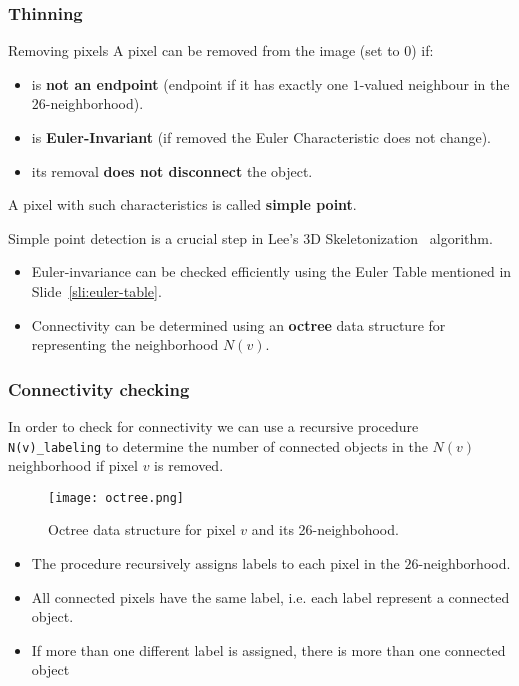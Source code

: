 \begin{frame}
  \frametitle{Thinning}
  \begin{block}{Removing pixels}
    A pixel can be removed from the image (set to 0) if:
    \begin{itemize}
      \item is \textbf{not an endpoint} (endpoint if it has exactly one $1$-valued neighbour in the $26$-neighborhood).
      \item is \textbf{Euler-Invariant} (if removed the Euler Characteristic does not change).
      \item its removal \textbf{does not disconnect} the object.
    \end{itemize}
    A pixel with such characteristics is called \textbf{simple point}.
  \end{block}
  Simple point detection is a crucial step in Lee's 3D Skeletonization~\cite{lee94} algorithm.
  \begin{itemize}
    \item Euler-invariance can be checked efficiently using the Euler Table mentioned in Slide~\vref{sli:euler-table}.
    \item Connectivity can be determined using an \textbf{octree} data structure for representing the neighborhood $N(v)$.
  \end{itemize}
\end{frame}

\begin{frame}
  \frametitle{Connectivity checking}
  In order to check for connectivity we can use a recursive procedure \lstinline{N(v)_labeling} to determine the number of connected objects in the $N(v)$ neighborhood if pixel $v$ is removed.
  \begin{figure}
    \centering
    \texttt{[image: octree.png]}
    \caption{Octree data structure for pixel $v$ and its 26-neighbohood.}
  \end{figure}
  \begin{itemize}
    \item The procedure recursively assigns labels to each pixel in the $26$-neighborhood.
    \item All connected pixels have the same label, i.e. each label represent a connected object.
    \item If more than one different label is assigned, there is more than one connected object
  \end{itemize}
\end{frame}

